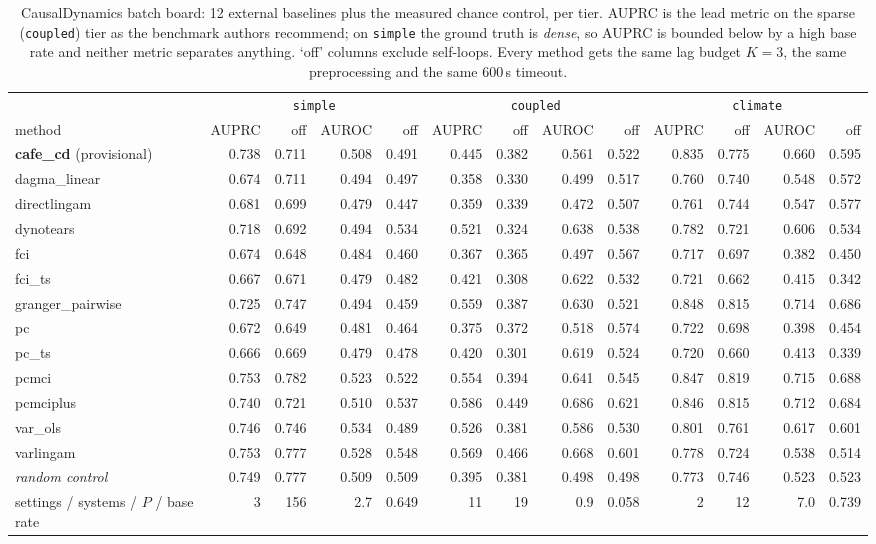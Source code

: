 \begin{table}[t]\centering\small
\caption{CausalDynamics batch board: 12 external baselines plus the measured chance control, per tier. AUPRC is the lead metric on the sparse (\texttt{coupled}) tier as the benchmark authors recommend; on \texttt{simple} the ground truth is \emph{dense}, so AUPRC is bounded below by a high base rate and neither metric separates anything. `off' columns exclude self-loops. Every method gets the same lag budget $K=3$, the same preprocessing and the same 600\,s timeout.}
\label{tab:bench-dynamics-h2h}
\begin{tabular}{lrrrrrrrrrrrr}\toprule
 & \multicolumn{4}{c}{\texttt{simple}} & \multicolumn{4}{c}{\texttt{coupled}} & \multicolumn{4}{c}{\texttt{climate}}\\
method & AUPRC & off & AUROC & off & AUPRC & off & AUROC & off & AUPRC & off & AUROC & off\\\midrule
\textbf{cafe\_cd} (provisional) & 0.738 & 0.711 & 0.508 & 0.491 & 0.445 & 0.382 & 0.561 & 0.522 & 0.835 & 0.775 & 0.660 & 0.595\\
dagma\_linear & 0.674 & 0.711 & 0.494 & 0.497 & 0.358 & 0.330 & 0.499 & 0.517 & 0.760 & 0.740 & 0.548 & 0.572\\
directlingam & 0.681 & 0.699 & 0.479 & 0.447 & 0.359 & 0.339 & 0.472 & 0.507 & 0.761 & 0.744 & 0.547 & 0.577\\
dynotears & 0.718 & 0.692 & 0.494 & 0.534 & 0.521 & 0.324 & 0.638 & 0.538 & 0.782 & 0.721 & 0.606 & 0.534\\
fci & 0.674 & 0.648 & 0.484 & 0.460 & 0.367 & 0.365 & 0.497 & 0.567 & 0.717 & 0.697 & 0.382 & 0.450\\
fci\_ts & 0.667 & 0.671 & 0.479 & 0.482 & 0.421 & 0.308 & 0.622 & 0.532 & 0.721 & 0.662 & 0.415 & 0.342\\
granger\_pairwise & 0.725 & 0.747 & 0.494 & 0.459 & 0.559 & 0.387 & 0.630 & 0.521 & 0.848 & 0.815 & 0.714 & 0.686\\
pc & 0.672 & 0.649 & 0.481 & 0.464 & 0.375 & 0.372 & 0.518 & 0.574 & 0.722 & 0.698 & 0.398 & 0.454\\
pc\_ts & 0.666 & 0.669 & 0.479 & 0.478 & 0.420 & 0.301 & 0.619 & 0.524 & 0.720 & 0.660 & 0.413 & 0.339\\
pcmci & 0.753 & 0.782 & 0.523 & 0.522 & 0.554 & 0.394 & 0.641 & 0.545 & 0.847 & 0.819 & 0.715 & 0.688\\
pcmciplus & 0.740 & 0.721 & 0.510 & 0.537 & 0.586 & 0.449 & 0.686 & 0.621 & 0.846 & 0.815 & 0.712 & 0.684\\
var\_ols & 0.746 & 0.746 & 0.534 & 0.489 & 0.526 & 0.381 & 0.586 & 0.530 & 0.801 & 0.761 & 0.617 & 0.601\\
varlingam & 0.753 & 0.777 & 0.528 & 0.548 & 0.569 & 0.466 & 0.668 & 0.601 & 0.778 & 0.724 & 0.538 & 0.514\\
\midrule
\emph{random control} & 0.749 & 0.777 & 0.509 & 0.509 & 0.395 & 0.381 & 0.498 & 0.498 & 0.773 & 0.746 & 0.523 & 0.523\\
\midrule settings / systems / $P$ / base rate & 3 & 156 & 2.7 & 0.649 & 11 & 19 & 0.9 & 0.058 & 2 & 12 & 7.0 & 0.739\\
\bottomrule\end{tabular}\end{table}

